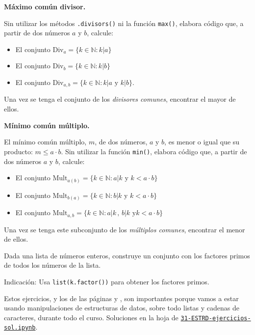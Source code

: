 \begin{ejer} {\bf Máximo común divisor.} 

Sin utilizar los métodos \lstinline|.divisors()| ni la función
\lstinline|max()|, 
elabora código que, a partir de dos números $a$ y $b$, calcule:
\begin{itemize}
\item El conjunto $\mathrm{Div}_a=\{k \in \mathbb N : k|a\}$
\item El conjunto $\mathrm{Div}_b=\{k \in \mathbb N : k|b\}$
\item El conjunto $\mathrm{Div}_{a,b}=\{k \in \mathbb N : k|a \text{ y } k|b\}$.
\end{itemize}
Una vez se tenga el conjunto de los \emph{divisores comunes}, encontrar el mayor
de ellos.
\end{ejer}


\begin{ejer} {\bf Mínimo común múltiplo.}

El mínimo común múltiplo, $m$, de dos números, $a$ y $b$, es menor o igual que
su
producto: $m\le a\cdot b$. Sin utilizar la función \lstinline|min()|, elabora
código 
que, a partir de dos números $a$ y $b$, calcule:
\begin{itemize}
\item El conjunto $\mathrm{Mult}_{a(b)}=\{k\in\mathbb{N}: a|k \text{ y }k<a\cdot
b\}$
\item El conjunto $\mathrm{Mult}_{b(a)}=\{k\in\mathbb{N}: b|k \text{ y }k<a\cdot
b\}$
\item El conjunto $\mathrm{Mult}_{a,b}=\{k\in\mathbb{N}: a|k\,,\,b|k \text{ y
}k<a\cdot
b\}$
\end{itemize}
Una vez se tenga este subconjunto de los \emph{múltiplos comunes}, encontrar el
menor de
ellos.
\end{ejer}

\begin{ejer}
Dada una lista de números enteros, construye un conjunto con los factores primos
de 
todos los números de la lista.

Indicación: Usa \lstinline|list(k.factor())| para obtener los factores primos.
\end{ejer}

Estos ejercicios, y los de las p\'aginas \pageref{ejer-0} y \pageref{ejer-1},
son importantes porque
vamos a estar usando  manipulaciones de estructuras de datos, sobre todo listas
y cadenas de caracteres, durante todo el curso. 
Soluciones en la hoja de {\sage}
\href{http://localhost:8888/notebooks/PROGR/31-ESTRD-ejercicios-sol.ipynb}{\tt31-ESTRD-ejercicios-sol.ipynb}.
                                
